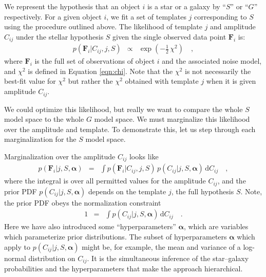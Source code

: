 \documentclass[12pt,preprint]{aastex}
\newcommand{\datavector}[1]{\boldsymbol{#1}}
\newcommand{\flux}{\datavector{F}}
\newcommand{\hyperpars}{\datavector{\alpha}}
\newcommand{\dd}{\mathrm{d}}
\begin{document}
We represent the hypothesis that an object $i$ is a star or a galaxy
by ``$S$'' or ``$G$'' respectively.  For a given object $i$, we fit a
set of templates $j$ corresponding to $S$ using the procedure outlined
above.  The likelihood of template $j$ and amplitude $C_{ij}$ under the stellar
hypothesis $S$ given the single observed data point $\flux_i$ is:
\begin{eqnarray}\displaystyle
p(\flux_i|C_{ij},j,S) & \propto & \exp(-\frac{1}{2}\,\chi^2)
\quad ,
\end{eqnarray}
where $\flux_i$ is the full set of observations of object $i$ and the
associated noise model, and $\chi^2$ is defined in Equation \ref{eqn:chi}. Note
that the $\chi^2$ is not necessarily the best-fit value for $\chi^2$
but rather the $\chi^2$ obtained with template $j$ when it is given
amplitude $C_{ij}$.

We could optimize this likelihood, but really we want to compare the
whole $S$ model space to the whole $G$ model space.  We must
marginalize this likelihood over the amplitude and template.  To 
demonstrate this, let us step through each marginalization for the 
$S$ model space.

Marginalization over the amplitude $C_{ij}$ looks like
\begin{eqnarray}\displaystyle
p(\flux_i|j,S,\hyperpars) & = & \int p(\flux_i|C_{ij},j,S)\,p(C_{ij}|j,S,\hyperpars)\,\dd C_{ij}
\quad ,
\label{eqn:fitmarg}
\end{eqnarray}
where the integral is over all permitted values for the amplitude
$C_{ij}$, and the prior PDF $p(C_{ij}|j,S,\hyperpars)$ depends on the
template $j$, the full hypothesis $S$.  Note, the prior PDF obeys the normalization
constraint
\begin{eqnarray}\displaystyle
1 & = & \int p(C_{ij}|j,S,\hyperpars)\,\dd C_{ij}
\quad .
\label{eqn:fitconstraint}
\end{eqnarray}
\noindent Here we have also introduced some 
``hyperparameters'' $\hyperpars$, which are variables which parameterize 
prior distributions.  The subset of hyperparameters $\hyperpars$ which 
apply to $p(C_{ij}|j,S,\hyperpars)$ might be, for example, the mean and variance of 
a log-normal distribution on $C_{ij}$.   It is the simultaneous inference
of the star--galaxy probabilities and the hyperparameters that
make the approach hierarchical.  
\end{document}
